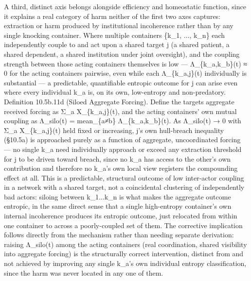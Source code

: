 \documentclass[
]{article}
\begin{document}
A third, distinct axis belongs alongside efficiency and homeostatic
function, since it explains a real category of harm neither of the first
two axes captures: extraction or harm produced by institutional
incoherence rather than by any single knocking container. Where multiple
containers \{k\_1, ..., k\_n\} each independently couple to and act upon
a shared target j (a shared patient, a shared dependent, a shared
institution under joint oversight), and the coupling strength between
those acting containers themselves is low --- Λ\_\{k\_a,k\_b\}(t) ≈ 0
for the acting containers pairwise, even while each Λ\_\{k\_a,j\}(t)
individually is substantial --- a predictable, quantifiable entropic
outcome for j can arise even where every individual k\_a is, on its own,
low-entropy and non-predatory. Definition 10.5b.11d (Siloed Aggregate
Forcing). Define the targets aggregate received forcing as Σ\_a
X\_\{k\_a,j\}(t), and the acting containers' own mutual coupling as
Λ\_silo(t) = mean\_\{a≠b\} Λ\_\{k\_a,k\_b\}(t). As Λ\_silo(t) → 0 with
Σ\_a X\_\{k\_a,j\}(t) held fixed or increasing, j's own hull-breach
inequality (§10.5a) is approached purely as a function of aggregate,
uncoordinated forcing --- no single k\_a need individually approach or
exceed any extraction threshold for j to be driven toward breach, since
no k\_a has access to the other's own contribution and therefore no
k\_a's own local view registers the compounding effect at all. This is a
predictable, structural outcome of low inter-actor coupling in a network
with a shared target, not a coincidental clustering of independently bad
actors: siloing between k\_1...k\_n is what makes the aggregate outcome
entropic, in the same direct sense that a single high-entropy
container's own internal incoherence produces its entropic outcome, just
relocated from within one container to across a poorly-coupled set of
them. The corrective implication follows directly from the mechanism
rather than needing separate derivation: raising Λ\_silo(t) among the
acting containers (real coordination, shared visibility into aggregate
forcing) is the structurally correct intervention, distinct from and not
achieved by improving any single k\_a's own individual entropy
classification, since the harm was never located in any one of them.
\end{document}
